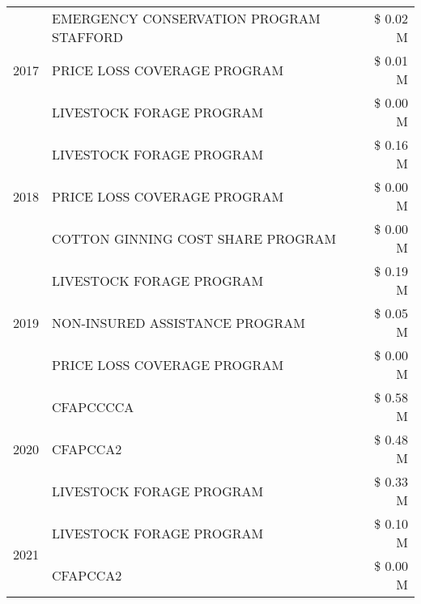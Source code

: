 \begin{tabular}{llr}
\cline{1-3}
\multirow[t]{3}{*}{2017} & EMERGENCY CONSERVATION PROGRAM STAFFORD & \$ 0.02 M \\
 & PRICE LOSS COVERAGE PROGRAM & \$ 0.01 M \\
 & LIVESTOCK FORAGE PROGRAM & \$ 0.00 M \\
\cline{1-3}
\multirow[t]{3}{*}{2018} & LIVESTOCK FORAGE PROGRAM & \$ 0.16 M \\
 & PRICE LOSS COVERAGE PROGRAM & \$ 0.00 M \\
 & COTTON GINNING COST SHARE PROGRAM & \$ 0.00 M \\
\cline{1-3}
\multirow[t]{3}{*}{2019} & LIVESTOCK FORAGE PROGRAM & \$ 0.19 M \\
 & NON-INSURED ASSISTANCE PROGRAM & \$ 0.05 M \\
 & PRICE LOSS COVERAGE PROGRAM & \$ 0.00 M \\
\cline{1-3}
\multirow[t]{3}{*}{2020} & CFAPCCCCA & \$ 0.58 M \\
 & CFAPCCA2 & \$ 0.48 M \\
 & LIVESTOCK FORAGE PROGRAM & \$ 0.33 M \\
\cline{1-3}
\multirow[t]{2}{*}{2021} & LIVESTOCK FORAGE PROGRAM & \$ 0.10 M \\
 & CFAPCCA2 & \$ 0.00 M \\
\cline{1-3}
\bottomrule
\end{tabular}
